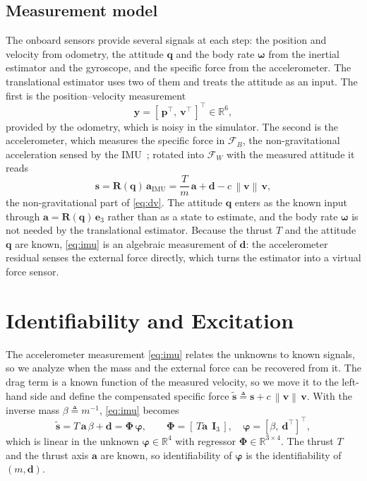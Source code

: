 \documentclass{ieeeaccess}
\newcommand{\R}{\mathbb{R}}
\newcommand{\norm}[1]{\left\| #1 \right\|}
\newcommand{\vect}[1]{\bm{#1}}
\newcommand{\mat}[1]{\mathbf{#1}}
\begin{document}
\subsection{Measurement model}
The onboard sensors provide several signals at each step: the position and
velocity from odometry, the attitude $\vect{q}$ and the body rate
$\vect{\omega}$ from the inertial estimator and the gyroscope, and the specific
force from the accelerometer. The translational estimator uses two of them and
treats the attitude as an input. The first is the position--velocity
measurement
\begin{equation}
\vect{y} = [\,\vect{p}^{\!\top},\ \vect{v}^{\!\top}\,]^{\!\top}\in\R^6 ,
\label{eq:y}
\end{equation}
provided by the odometry, which is noisy in the simulator. The second is the
accelerometer, which measures the specific force in $\mathcal{F}_B$, the
non-gravitational acceleration sensed by the IMU~\cite{forster2015imu}; rotated into
$\mathcal{F}_W$ with the measured attitude it reads
\begin{equation}
\vect{s} = \mat{R}(\vect{q})\,\vect{a}_{\text{IMU}}
         = \frac{T}{m}\,\vect{a} + \vect{d} - c\,\norm{\vect{v}}\,\vect{v},
\label{eq:imu}
\end{equation}
the non-gravitational part of \eqref{eq:dv}. The attitude $\vect{q}$ enters as
the known input through $\vect{a}=\mat{R}(\vect{q})\,\vect{e}_3$ rather than as a
state to estimate, and the body rate $\vect{\omega}$ is not needed by the
translational estimator. Because the thrust $T$ and the attitude $\vect{q}$ are
known, \eqref{eq:imu} is an algebraic measurement of $\vect{d}$: the
accelerometer residual senses the external force directly, which turns the
estimator into a virtual force sensor.

\section{Identifiability and Excitation}\label{sec:obs}

The accelerometer measurement \eqref{eq:imu} relates the unknowns to known
signals, so we analyze when the mass and the external force can be recovered
from it. The drag term is a known function of the measured velocity, so we move
it to the left-hand side and define the compensated specific force
$\tilde{\vect{s}}\triangleq\vect{s}+c\,\norm{\vect{v}}\,\vect{v}$. With the
inverse mass $\beta\triangleq m^{-1}$, \eqref{eq:imu} becomes
\begin{equation}
\tilde{\vect{s}} = T\,\vect{a}\,\beta + \vect{d}
                 = \mat{\Phi}\,\vect{\varphi},
\qquad
\mat{\Phi} = [\,T\vect{a}\ \ \mat{I}_3\,],\quad
\vect{\varphi}=[\beta,\ \vect{d}^{\!\top}]^{\!\top},
\label{eq:regressor}
\end{equation}
which is linear in the unknown $\vect{\varphi}\in\R^4$ with regressor
$\mat{\Phi}\in\R^{3\times4}$. The thrust $T$ and the thrust axis $\vect{a}$ are
known, so identifiability of $\vect{\varphi}$ is the identifiability of
$(m,\vect{d})$.
\end{document}
